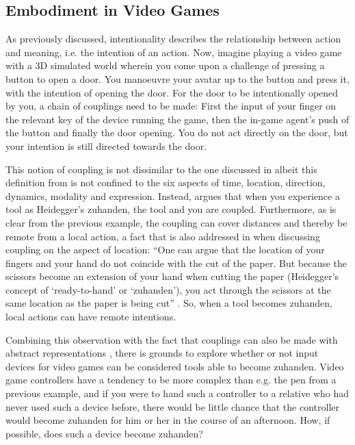 \subsection{Embodiment in Video Games}
As previously discussed, intentionality describes the relationship between action and meaning, i.e. the intention of an action. Now, imagine playing a video game with a 3D simulated world wherein you come upon a challenge of pressing a button to open a door. You manoeuvre your avatar up to the button and press it, with the intention of opening the door. For the door to be intentionally opened by you, a chain of couplings \cite{dourish} need to be made: First the input of your finger on the relevant key of the device running the game, then the in-game agent's push of the button and finally the door opening. You do not act directly on the door, but your intention is still directed towards the door.

This notion of coupling is not dissimilar to the one discussed in  albeit this definition from  is not confined to the six aspects of time, location, direction, dynamics, modality and expression. Instead,  argues that when you experience a tool as Heidegger's zuhanden, the tool and you are coupled. Furthermore, as is clear from the previous example, the coupling can cover distances and thereby be remote from a local action, a fact that is also addressed in  when discussing coupling on the aspect of location: ``One can argue that the location of your fingers and your hand do not coincide with the cut of the paper. But because the scissors become an extension of your hand when cutting the paper (Heidegger’s concept of ‘ready-to-hand’ or ‘zuhanden’), you act through the scissors at the same location as the paper is being cut'' \cite[p. 2]{frogger}. So, when a tool becomes zuhanden, local actions can have remote intentions.

Combining this observation with the fact that couplings can also be made with abstract representations \cite{dourish}, there is grounds to explore whether or not input devices for video games can be considered tools able to become zuhanden. Video game controllers have a tendency to be more complex than e.g. the pen from a previous example, and if you were to hand such a controller to a relative who had never used such a device before, there would be little chance that the controller would become zuhanden for him or her in the course of an afternoon. How, if possible, does such a device become zuhanden?

